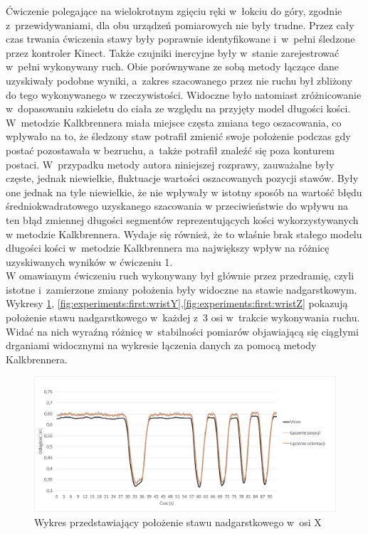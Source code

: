 Ćwiczenie polegające na wielokrotnym zgięciu ręki w~łokciu do góry, zgodnie z~przewidywaniami, dla obu urządzeń pomiarowych nie były trudne. Przez cały czas trwania ćwiczenia stawy były poprawnie identyfikowane i~w~pełni śledzone przez kontroler Kinect. Także czujniki inercyjne były w~stanie zarejestrować w~pełni  wykonywany ruch. Obie porównywane ze sobą metody łączące dane uzyskiwały podobne wyniki, a~zakres szacowanego przez nie ruchu był zbliżony do tego wykonywanego w rzeczywistości. Widoczne było natomiast zróżnicowanie w~dopasowaniu szkieletu do ciała ze względu na przyjęty model długości kości. W~metodzie Kalkbrennera miała miejsce częsta zmiana tego oszacowania, co wpływało na to, że śledzony staw potrafił zmienić swoje położenie podczas gdy postać pozostawała w bezruchu, a~także potrafił znaleźć się poza konturem postaci. W~przypadku metody autora niniejszej rozprawy, zauważalne były częste, jednak niewielkie, fluktuacje wartości oszacowanych pozycji stawów. Były one jednak na tyle niewielkie, że nie wpływały w istotny sposób na wartość błędu średniokwadratowego uzyskanego szacowania w przeciwieństwie do wpływu na ten błąd zmiennej długości segmentów reprezentujących kości wykorzystywanych w metodzie Kalkbrennera. Wydaje się również, że to właśnie brak stałego modelu długości kości w~metodzie Kalkbrennera ma największy wpływ na różnicę uzyskiwanych wyników w ćwiczeniu 1. \\
						
W omawianym ćwiczeniu ruch wykonywany był głównie przez przedramię, czyli istotne i~zamierzone zmiany położenia były widoczne na stawie nadgarstkowym. Wykresy \ref{fig:experiments:first:wristX}, \ref{fig:experiments:first:wristY},\ref{fig:experiments:first:wristZ} pokazują położenie stawu nadgarstkowego w~każdej z~3 osi w~trakcie wykonywania ruchu. Widać na nich wyraźną różnicę w~stabilności pomiarów objawiającą się ciągłymi drganiami widocznymi na wykresie łączenia danych za pomocą metody Kalkbrennera.
						
\begin{savenotes}
	\begin{figure}[!htb]
		\centering
		\includegraphics[width=0.9\linewidth]{images/100/Slide4.png}
		\caption{Wykres przedstawiający położenie stawu nadgarstkowego w~osi X}
		\label{fig:experiments:first:wristX}
	\end{figure}
\end{savenotes}
								
